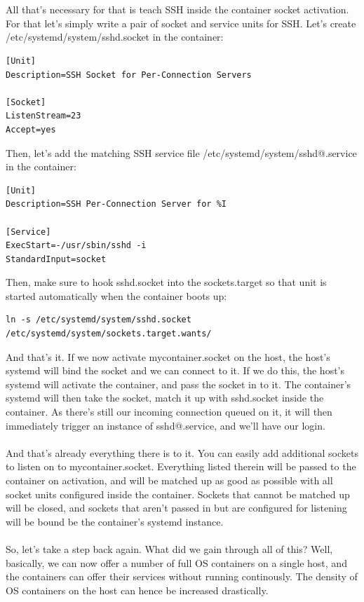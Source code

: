 \documentclass[titlepage]{article}
\begin{document}
\\
\\
All that's necessary for that is teach SSH inside the container socket activation. For that let's simply write a pair of socket and service units for SSH. Let's create /etc/systemd/system/sshd.socket in the container:
\begin{lstlisting}
[Unit]
Description=SSH Socket for Per-Connection Servers

[Socket]
ListenStream=23
Accept=yes
\end{lstlisting}
Then, let's add the matching SSH service file /etc/systemd/system/sshd@.service in the container:
\begin{lstlisting}
[Unit]
Description=SSH Per-Connection Server for %I

[Service]
ExecStart=-/usr/sbin/sshd -i
StandardInput=socket
\end{lstlisting}
Then, make sure to hook sshd.socket into the sockets.target so that unit is started automatically when the container boots up:
\begin{lstlisting}
ln -s /etc/systemd/system/sshd.socket /etc/systemd/system/sockets.target.wants/
\end{lstlisting}
And that's it. If we now activate mycontainer.socket on the host, the host's systemd will bind the socket and we can connect to it. If we do this, the host's systemd will activate the container, and pass the socket in to it. The container's systemd will then take the socket, match it up with sshd.socket inside the container. As there's still our incoming connection queued on it, it will then immediately trigger an instance of sshd@.service, and we'll have our login.
\\
\\
And that's already everything there is to it. You can easily add additional sockets to listen on to mycontainer.socket. Everything listed therein will be passed to the container on activation, and will be matched up as good as possible with all socket units configured inside the container. Sockets that cannot be matched up will be closed, and sockets that aren't passed in but are configured for listening will be bound be the container's systemd instance.
\\
\\
So, let's take a step back again. What did we gain through all of this? Well, basically, we can now offer a number of full OS containers on a single host, and the containers can offer their services without running continously. The density of OS containers on the host can hence be increased drastically.
\end{document}
